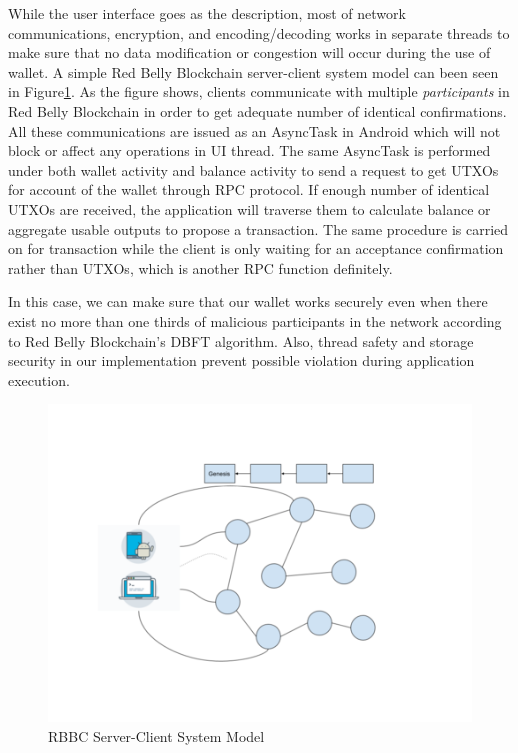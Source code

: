 \documentclass[12pt]{article}
\begin{document}
While the user interface goes as the description, most of network communications, encryption, and encoding/decoding works in separate threads to make sure that no data modification or congestion will occur during the use of wallet. A simple Red Belly Blockchain server-client system model can been seen in Figure\ref{fig:server_client}. As the figure shows, clients communicate with multiple \textit{participants} in Red Belly Blockchain in order to get adequate number of identical confirmations. All these communications are issued as an AsyncTask in Android which will not block or affect any operations in UI thread. The same AsyncTask is performed under both wallet activity and balance activity to send a request to get UTXOs for account of the wallet through RPC protocol. If enough number of identical UTXOs are received, the application will traverse them to calculate balance or aggregate usable outputs to propose a transaction. The same procedure is carried on for transaction while the client is only waiting  for an acceptance confirmation rather than UTXOs, which is another RPC function definitely.

In this case, we can make sure that our wallet works securely even when there exist no more than one thirds of malicious participants in the network according to Red Belly Blockchain's DBFT algorithm. Also, thread safety and storage security in our implementation prevent possible violation during application execution.

\begin{figure}
    \centering
    \includegraphics{server_client.png}
    \caption{RBBC Server-Client System Model}
    \label{fig:server_client}
\end{figure}
\end{document}
